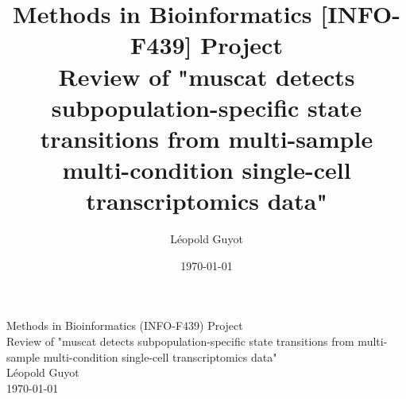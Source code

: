 \documentclass[a4paper, 11pt, twocolumn]{article}
\title{\Large Methods in Bioinformatics [INFO-F439] Project \\
\huge Review of "muscat detects subpopulation-specific state transitions from multi-sample multi-condition single-cell transcriptomics data"}
\author{Léopold Guyot}
\date{\today}
\begin{document}
\pagestyle{fancy}
\setlength{\headheight}{25.0117pt}
\fancyhead{}\fancyfoot{}
\fancyfoot[R]{\thepage}



\onecolumn
\vspace*{-1.5cm}  %
\begin{center}
	{\Large Methods in Bioinformatics (INFO-F439)  Project}\\[1ex]
	{\huge Review of "muscat detects subpopulation-specific state transitions from multi-sample multi-condition single-cell transcriptomics data" \cite{crowell2020muscat}}\\[2ex]
	{\large Léopold Guyot}\\[1ex]
	{\today}
\end{center}
 
\thispagestyle{plainfooter}



\end{document}
